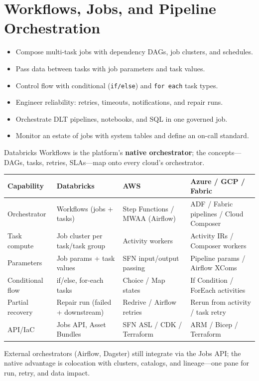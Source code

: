 \chapter{Workflows, Jobs, and Pipeline Orchestration}
%
%
\begin{objectives}
\begin{itemize}
    \item Compose multi-task jobs with dependency DAGs, job clusters, and schedules.
    \item Pass data between tasks with job parameters and task values.
    \item Control flow with conditional (\texttt{if/else}) and \texttt{for each} task types.
    \item Engineer reliability: retries, timeouts, notifications, and repair runs.
    \item Orchestrate DLT pipelines, notebooks, and SQL in one governed job.
    \item Monitor an estate of jobs with system tables and define an on-call standard.
\end{itemize}
\end{objectives}

\begin{crosscloud}
Databricks Workflows is the platform's \textbf{native orchestrator}; the concepts---DAGs, tasks,
retries, SLAs---map onto every cloud's orchestrator.

\vspace{2mm}
{\footnotesize
\begin{tabular}{@{}p{3.0cm}p{3.4cm}p{3.2cm}p{3.2cm}@{}}
\toprule
\textbf{Capability} & \textbf{Databricks} & \textbf{AWS} & \textbf{Azure / GCP / Fabric} \\
\midrule
Orchestrator & Workflows (jobs + tasks) & Step Functions / MWAA (Airflow) & ADF / Fabric pipelines / Cloud Composer \\
Task compute & Job cluster per task/task group & Activity workers & Activity IRs / Composer workers \\
Parameters & Job params + task values & SFN input/output passing & Pipeline params / Airflow XComs \\
Conditional flow & if/else, for-each tasks & Choice / Map states & If Condition / ForEach activities \\
Partial recovery & Repair run (failed + downstream) & Redrive / Airflow retries & Rerun from activity / task retry \\
API/IaC & Jobs API, Asset Bundles & SFN ASL / CDK / Terraform & ARM / Bicep / Terraform \\
\bottomrule
\end{tabular}}

\vspace{1mm}
External orchestrators (Airflow, Dagster) still integrate via the Jobs API; the native advantage
is colocation with clusters, catalogs, and lineage---one pane for run, retry, and data impact.
\end{crosscloud}

